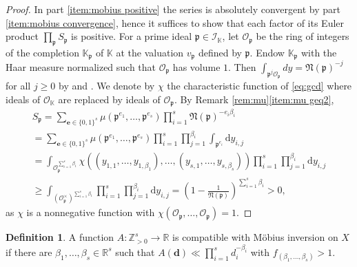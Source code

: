 \documentclass[10pt, a4paper, reqno, english]{amsart}
\newcommand\ZZ{\mathbb{Z}}
\newcommand\RR{\mathbb{R}}
\newcommand{\KK}{\mathbb{K}} %
\newcommand{\idealnorm}{\mathfrak{N}}
\newcommand{\OO}{\mathcal{O}} %
\theoremstyle{definition}
\newtheorem{definition}[theorem]{Definition}
\numberwithin{theorem}{section}
\numberwithin{equation}{section}
\begin{document}
\begin{proof}
In part \ref{item:mobius positive} 
 the series is absolutely convergent by part \ref{item:mobius convergence}, hence it suffices to show that each factor of its Euler product $\prod_{\mathfrak p} S_{\mathfrak p}$ is positive. 
For a prime ideal $\mathfrak p\in\mathcal I_{\KK}$, let $\OO_{\mathfrak p}$ be the ring of integers of the completion $\KK_{\mathfrak p}$ of $\KK$ at the valuation $v_{\mathfrak p}$ defined by $\mathfrak p$. Endow $\KK_{\mathfrak p}$ with the Haar measure normalized such that $\OO_{\mathfrak p}$ has volume $1$. Then $\int_{\mathfrak p^j \OO_{\mathfrak p}}dy=\idealnorm(\mathfrak p)^{-j}$ for all $j\geq 0$ by \cite[\S 1.1.13]{MR3838446} and \cite[Proposition II.4.3]{MR1697859}. We denote by $\chi$ the characteristic function of \eqref{eq:gcd} where ideals of $\OO_{\KK}$ are replaced by ideals of $\OO_{\mathfrak p}$.
By Remark \ref{rem:mu}\ref{item:mu geq2},
\begin{gather*}
S_{\mathfrak p}=\sum_{\boldsymbol e\in\{0,1\}^s}\mu(\mathfrak p^{e_1},\dots,\mathfrak p^{e_s})\prod_{i=1}^s\idealnorm(\mathfrak p)^{-e_i\beta_i} 
\\ = \sum_{\boldsymbol e\in\{0,1\}^s}\mu(\mathfrak p^{e_1},\dots,\mathfrak p^{e_s})\prod_{i=1}^s \prod_{j=1}^{\beta_i} \int_{\mathfrak p^{e_i}} \mathrm d y_{i,j}
\\ = \int_{\OO_{\mathfrak p}^{\sum_{i=1}^s \beta_i}}\chi((y_{1,1},\dots,y_{1,\beta_1}),\dots, (y_{s,1},\dots,y_{s,\beta_s}))\prod_{i=1}^s\prod_{j=1}^{\beta_i} \mathrm d y_{i,j}
\\ \geq \int_{(\OO_{\mathfrak p}^\times)^{\sum_{i=1}^s \beta_i}}\prod_{i=1}^s\prod_{j=1}^{\beta_i} \mathrm d y_{i,j} = \left(1-\frac 1{\idealnorm(\mathfrak p)}\right)^{\sum_{i=1}^s \beta_i}>0,
\end{gather*}
as $\chi$ is a nonnegative function with $\chi(\OO_{\mathfrak p},\dots,\OO_{\mathfrak p})=1$.
\end{proof}	

\begin{definition}
A function $A:\ZZ^s_{>0}\to\RR$ is compatible with M\"obius inversion on $X$ if there are $\beta_1,\dots,\beta_s\in\RR^s$ such that $A(\mathbf d)\ll\prod_{i=1}^sd_i^{-\beta_i}$ with $f_{(\beta_1,\dots,\beta_s)}>1$. 
\end{definition}
	
\end{document}
